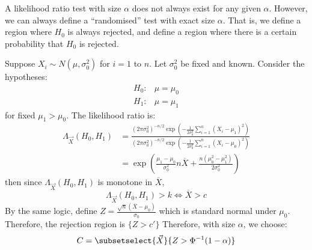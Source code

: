 \documentclass[../Main.tex]{subfiles}
\begin{document}
\begin{remark}
    A likelihood ratio test with size $\alpha$ does not always exist for any given $\alpha$. However, we can always define a ``randomised'' test with exact size $\alpha$. That is, we define a region where $H_0$ is always rejected, and define a region where there is a certain probability that $H_0$ is rejected.
\end{remark}
\begin{example}
    Suppose $X_i \sim N(\mu, \sigma_0^2)$ for $i = 1$ to $n$. Let $\sigma_0^2$ be fixed and known. Consider the hypotheses:
    \begin{align*}
        H_0: & \mu = \mu_0 \\
        H_1: & \mu = \mu_1
    \end{align*}
    for fixed $\mu_1 > \mu_0$. The likelihood ratio is:
    \begin{align*}
        \Lambda_{\vec{X}}(H_0, H_1) &= \frac{(2\pi\sigma_0^2)^{-n / 2} \exp\left(-\frac{1}{2\sigma_0^2} \sum_{i=1}^{n} (X_i - \mu_1)^2\right)}{(2\pi\sigma_0^2)^{-n / 2} \exp\left(-\frac{1}{2\sigma_0^2} \sum_{i=1}^{n} (X_i - \mu_0)^2\right)} \\
        &= \exp\left(\frac{\mu_1 - \mu_0}{\sigma_0^2} n \overline{X} + \frac{n(\mu_0^2 - \mu_1^2)}{2\sigma_0^2}\right)
    \end{align*}
    then since $\Lambda_{\vec{X}}(H_0, H_1)$ is monotone in $\overline{X}$,
    \begin{equation*}
        \Lambda_{\vec{X}}(H_0, H_1) > k \iff \overline{X} > c
    \end{equation*}
    By the same logic, define $Z = \frac{\sqrt{n}(\overline{X} - \mu_0)}{\sigma_0}$ which is standard normal under $\mu_0$. Therefore, the rejection region is $\{Z > c'\}$ Therefore, with size $\alpha$, we choose:
    \begin{equation*}
        C = \subsetselect{\vec{X}}{Z > \Phi^{-1}(1-\alpha)}
    \end{equation*}
\end{example}
\end{document}
